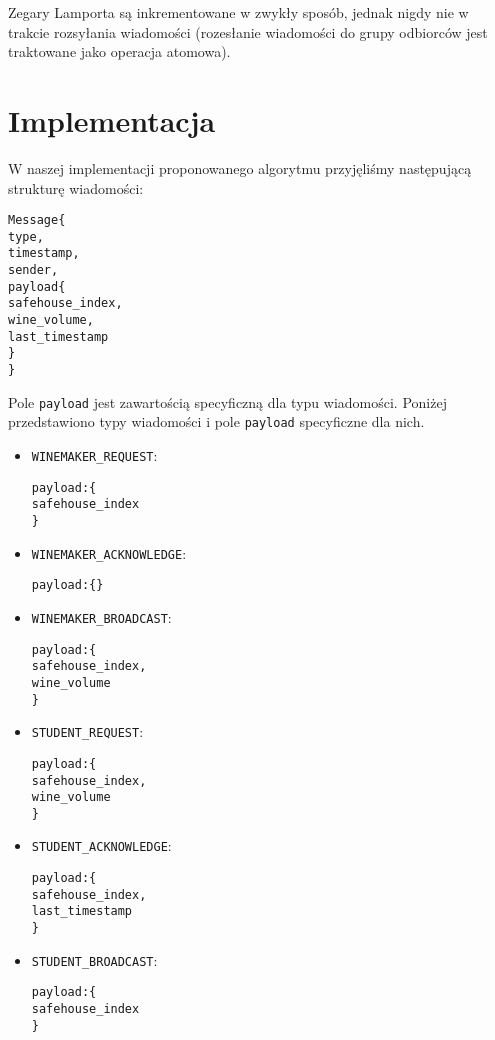 \documentclass[12pt, a4paper, oneside]{article}
\begin{document}
Zegary Lamporta są inkrementowane w zwykły sposób, jednak nigdy nie w trakcie rozsyłania wiadomości (rozesłanie wiadomości do grupy odbiorców jest traktowane jako operacja atomowa).

\section*{Implementacja}

W naszej implementacji proponowanego algorytmu przyjęliśmy następującą strukturę wiadomości:

\begin{alltt}
Message \{
    type,
    timestamp,
    sender,
    payload \{
        safehouse\_index,
        wine\_volume,
        last\_timestamp
    \}
\}
\end{alltt}

Pole \texttt{payload} jest zawartością specyficzną dla typu wiadomości.
Poniżej przedstawiono typy wiadomości i pole \texttt{payload} specyficzne dla nich.

\begin{itemize}

\item \texttt{WINEMAKER\_REQUEST}:
\begin{alltt}
payload: \{
    safehouse\_index
\}
\end{alltt}

\item \texttt{WINEMAKER\_ACKNOWLEDGE}:
\begin{alltt}
payload: \{\}
\end{alltt}

\item \texttt{WINEMAKER\_BROADCAST}:
\begin{alltt}
payload: \{
    safehouse\_index,
    wine\_volume
\}
\end{alltt}

\item \texttt{STUDENT\_REQUEST}:
\begin{alltt}
payload: \{
    safehouse\_index,
    wine\_volume
\}
\end{alltt}

\item \texttt{STUDENT\_ACKNOWLEDGE}:
\begin{alltt}
payload: \{
    safehouse\_index,
    last\_timestamp
\}
\end{alltt}

\item\texttt{STUDENT\_BROADCAST}:
\begin{alltt}
payload: \{
    safehouse\_index
\}
\end{alltt}

\end{itemize}
\end{document}
